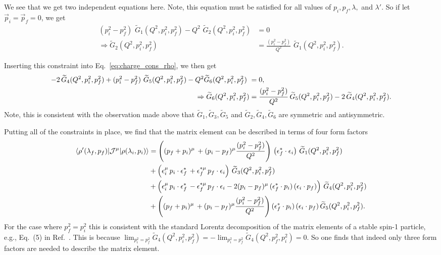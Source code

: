 We see that we get two independent equations here. Note, this equation must be satisfied for all values of $p_i,p_f,\lambda,$ and $\lambda'$. So if let $\vec{p}_i=\vec{p}_f=0$, we get 
\begin{align}
(p_i^2-p_f^2) \,\, \widetilde{G}_1(Q^2,p_i^2,p_f^2)
-Q^2 \,\,\widetilde{G}_2(Q^2,p_i^2,p_f^2)&=0
\\
\Rightarrow
\widetilde{G}_2(Q^2,p_i^2,p_f^2)&=
\frac{(p_i^2-p_f^2)}{Q^2} \,\, \widetilde{G}_1(Q^2,p_i^2,p_f^2).
\end{align}

Inserting this constraint into Eq.~\ref{eq:charge_cons_rho}, we then get
\begin{align}
-2
\,\widetilde{G}_4(Q^2,p_i^2,p_f^2)
+(p_i^2-p_f^2) \,\,\widetilde{G}_5(Q^2,p_i^2,p_f^2)
-Q^2\widetilde{G}_6(Q^2,p_i^2,p_f^2) \,\,
&=0,
\nonumber\\
\Rightarrow
\widetilde{G}_6(Q^2,p_i^2,p_f^2)&=\frac{(p_i^2-p_f^2)}{Q^2} \,\widetilde{G}_5(Q^2,p_i^2,p_f^2)-
2
\,\widetilde{G}_4(Q^2,p_i^2,p_f^2).
\end{align}
Note, this is consistent with the observation made above that $\widetilde{G}_1,\widetilde{G}_3,\widetilde{G}_5$ and $\widetilde{G}_2,\widetilde{G}_4,\widetilde{G}_6$ are symmetric and antisymmetric.

Putting all of the constraints in place, we find that the matrix element can be described in terms of four form factors
\begin{align}
\langle\rho'(\lambda_f,p_f)|{\mathcal{J}}^{\mu}|\rho(\lambda_i,p_i)\rangle
&=
\left((p_f+p_i)^\mu \,+(p_i-p_f)^\mu\frac{(p_i^2-p_f^2)}{Q^2} \right)\,\left(\epsilon_f^*\cdot \epsilon_i\right)\, \widetilde{G}_1(Q^2,p_i^2,p_f^2)\,
\nonumber\\&
+\left(\epsilon_i^\mu\, p_i \cdot \epsilon_f^*\,
+\epsilon_f^{*\mu}\, p_f\cdot \epsilon_i\right)\,\widetilde{G}_3(Q^2,p_i^2,p_f^2)\,
\nonumber\\
&+\left(\epsilon_i^\mu\, p_i\cdot \epsilon_f^*\,-\epsilon_f^{*\mu}\, p_f\cdot \epsilon_i
-2
(p_i-p_f)^\mu \,(\epsilon_f^*\cdot p_i)\,(\epsilon_i\cdot p_f)
\right)
\,\widetilde{G}_4(Q^2,p_i^2,p_f^2)
\nonumber\\&
+\left((p_f+p_i)^\mu \,+(p_i-p_f)^\mu\frac{(p_i^2-p_f^2)}{Q^2} \right)(\epsilon_f^*\cdot p_i)\,(\epsilon_i\cdot p_f)\,\widetilde{G}_5(Q^2,p_i^2,p_f^2).
\label{eq:rho_to_rho_FF}
\end{align}
{}
 For the case where $p_f^2=p_i^2$ this is consistent with the standard Lorentz decomposition of the matrix elements of a stable spin-1 particle, e.g., Eq.~(5) in Ref.~\cite{Shultz:2015pfa}. This is because $\lim_{p_i^2=p_f^2}\widetilde{G}_4(Q^2,p_i^2,p_f^2)=-\lim_{p_i^2=p_f^2}\widetilde{G}_4(Q^2,p_f^2,p_i^2)=0$. So one finds that indeed only three form factors are needed to describe the matrix element. 

